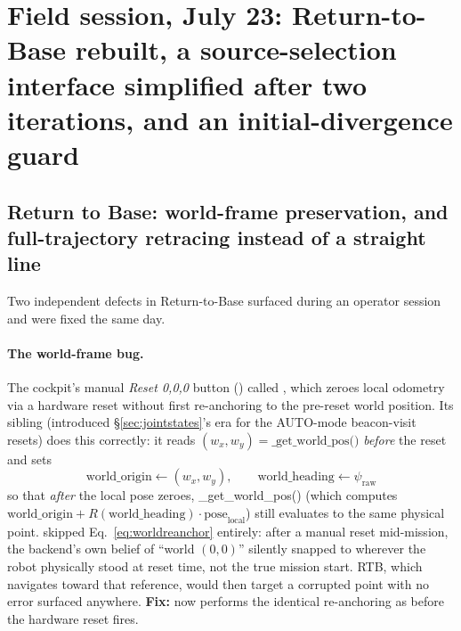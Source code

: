 \section{Field session, July 23: Return-to-Base rebuilt, a source-selection
interface simplified after two iterations, and an initial-divergence guard}
\label{sec:july23}

\subsection{Return to Base: world-frame preservation, and full-trajectory
retracing instead of a straight line}
\label{sec:july23rtb}
Two independent defects in Return-to-Base surfaced during an operator
session and were fixed the same day.

\paragraph{The  world-frame bug.} The cockpit's manual
\emph{Reset 0,0,0} button () called
, which zeroes local odometry via a hardware reset
without first re-anchoring  to the
pre-reset world position. Its sibling 
(introduced \S\ref{sec:jointstates}'s era for the AUTO-mode beacon-visit
resets) does this correctly: it reads $(w_x,w_y)=\text{\_get\_world\_pos()}$
\emph{before} the reset and sets
\begin{equation}
  \text{world\_origin} \leftarrow (w_x, w_y), \qquad
  \text{world\_heading} \leftarrow \psi_{\text{raw}}
  \label{eq:worldreanchor}
\end{equation}
so that \emph{after} the local pose zeroes, \_get\_world\_pos() (which
computes $\text{world\_origin} + R(\text{world\_heading})\cdot
\text{pose}_{\text{local}}$) still evaluates to the same physical point.
 skipped Eq.~\ref{eq:worldreanchor} entirely: after a
manual reset mid-mission, the backend's own belief of ``world $(0,0)$''
silently snapped to wherever the robot physically stood at reset time, not
the true mission start. RTB, which navigates toward that reference, would
then target a corrupted point with no error surfaced anywhere. \textbf{Fix:}
 now performs the identical re-anchoring as
 before the hardware reset fires.

